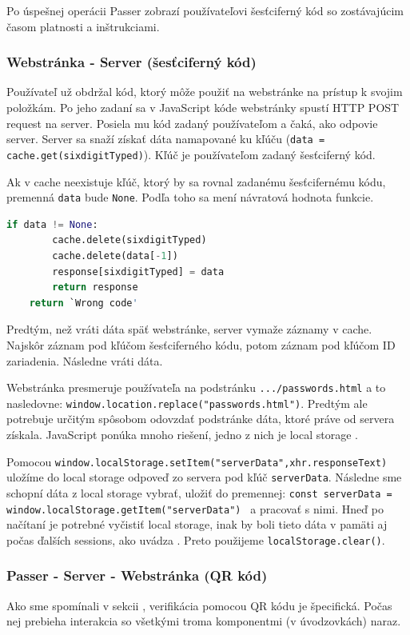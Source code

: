 Po úspešnej operácii Passer zobrazí používateľovi šesťciferný kód so zostávajúcim časom platnosti a inštrukciami.
\subsubsection{Webstránka - Server (šesťciferný kód)}
Používateľ už obdržal kód, ktorý môže použiť na webstránke na prístup k svojim položkám. Po jeho zadaní sa v JavaScript kóde webstránky spustí HTTP POST request na server. Posiela mu kód zadaný používateľom a čaká, ako odpovie server. Server sa snaží získať dáta namapované ku kľúču (\texttt{data = cache.get(sixdigitTyped)}). Kľúč je používateľom zadaný šesťciferný kód. 

Ak v cache neexistuje kľúč, ktorý by sa rovnal zadanému šesťcifernému kódu, premenná \texttt{data} bude \texttt{None}. Podľa toho sa mení návratová hodnota funkcie. 
\begin{lstlisting}[language=Python, basicstyle=\small]
    if data != None:
        cache.delete(sixdigitTyped)
        cache.delete(data[-1])
        response[sixdigitTyped] = data
        return response
    return `Wrong code'
\end{lstlisting}

Predtým, než vráti dáta späť webstránke, server vymaže záznamy v cache. Najskôr záznam pod kľúčom šesťciferného kódu, potom záznam pod kľúčom ID zariadenia. Následne vráti dáta.

Webstránka presmeruje používateľa na podstránku \texttt{.../passwords.html} a to nasledovne: \texttt{window.location.replace("passwords.html")}. Predtým ale potrebuje určitým spôsobom odovzdať podstránke dáta, ktoré práve od servera získala. JavaScript ponúka mnoho riešení, jedno z nich je local storage \cite{localstorage}.

\begin{sloppypar}
    Pomocou \texttt{window.localStorage.setItem("serverData",xhr.responseText)} uložíme do local storage odpoveď zo servera pod kľúč \texttt{serverData}. Následne sme schopní dáta z local storage vybrať, uložiť do premennej: \texttt{const serverData = window.localStorage.getItem("serverData")
    } a pracovať s nimi. Hneď po načítaní je potrebné vyčistiť local storage, inak by boli tieto dáta v pamäti aj počas ďalších sessions, ako uvádza \cite{localstorage}. Preto použijeme \texttt{localStorage.clear()}.
\end{sloppypar}

\subsubsection{Passer - Server - Webstránka (QR kód)}
Ako sme spomínali v sekcii , verifikácia pomocou QR kódu je špecifická. Počas nej prebieha interakcia so všetkými troma komponentmi (v úvodzovkách) naraz. 

